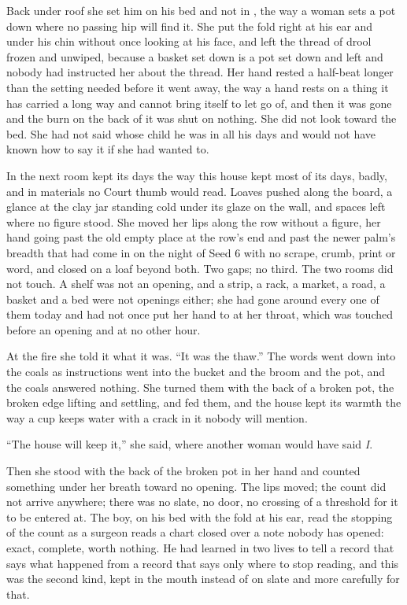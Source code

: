 \scenebreak

Back under  roof she set him on his bed and not in , the way a woman sets a pot down where no passing hip will find it. She put the fold right at his ear and under his chin without once looking at his face, and left the thread of drool frozen and unwiped, because a basket set down is a pot set down and left and nobody had instructed her about the thread. Her hand rested a half-beat longer than the setting needed before it went away, the way a hand rests on a thing it has carried a long way and cannot bring itself to let go of, and then it was gone and the burn on the back of it was shut on nothing. She did not look toward the bed. She had not said whose child he was in all his days and would not have known how to say it if she had wanted to.

In the next room  kept its days the way this house kept most of its days, badly, and in materials no Court thumb would read. Loaves pushed along the board, a glance at the clay jar standing cold under its glaze on the wall, and spaces left where no figure stood. She moved her lips along the row without a figure, her hand going past the old empty place at the row's end and past the newer palm's breadth that had come in on the night of Seed 6 with no scrape, crumb, print or word, and closed on a loaf beyond both. Two gaps; no third. The two rooms did not touch. A shelf was not an opening, and a strip, a rack, a market, a road, a basket and a bed were not openings either; she had gone around every one of them today and had not once put her hand to  at her throat, which was touched before an opening and at no other hour.

At the fire she told it what it was. “It was the thaw.” The words went down into the coals as instructions went into the bucket and the broom and the pot, and the coals answered nothing. She turned them with the back of a broken pot, the broken edge lifting and settling, and fed them, and the house kept its warmth the way a cup keeps water with a crack in it nobody will mention.

“The house will keep it,” she said, where another woman would have said \emph{I}.

Then she stood with the back of the broken pot in her hand and counted something under her breath toward no opening. The lips moved; the count did not arrive anywhere; there was no slate, no door, no crossing of a threshold for it to be entered at. The boy, on his bed with the fold at his ear, read the stopping of the count as a surgeon reads a chart closed over a note nobody has opened: exact, complete, worth nothing. He had learned in two lives to tell a record that says what happened from a record that says only where to stop reading, and this was the second kind, kept in the mouth instead of on slate and more carefully for that.


